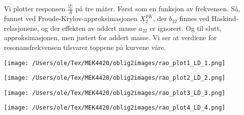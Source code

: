 Vi plotter responsen $\frac{|\xi|}{A}$ på tre måter. Først som en funksjon av frekvensen. Så, funnet ved Froude-Krylov-approksimasjonen $X_2^{FK}$, der $b_{22}$ finnes ved Haskind-relasjonene, og der effekten av addert masse $a_{22}$ er ignorert. Og til slutt, approksimasjonen, men justert for addert masse. Vi ser at verdiene for resonansfrekvensen tilsvarer toppene på kurvene våre.

\noindent
\begin{minipage}[t]{0.45\linewidth}
    \texttt{[image: /Users/ole/Tex/MEK4420/oblig2images/rao\_plot1\_LD\_1.png]}
\end{minipage}
\hspace{0.05\linewidth}
\begin{minipage}[t]{0.45\linewidth}
    \texttt{[image: /Users/ole/Tex/MEK4420/oblig2images/rao\_plot2\_LD\_2.png]}
\end{minipage}

\vspace{0.5cm} %

\noindent
\begin{minipage}[t]{0.45\linewidth}
    \texttt{[image: /Users/ole/Tex/MEK4420/oblig2images/rao\_plot3\_LD\_3.png]}
\end{minipage}
\hspace{0.05\linewidth}
\begin{minipage}[t]{0.45\linewidth}
    \texttt{[image: /Users/ole/Tex/MEK4420/oblig2images/rao\_plot4\_LD\_4.png]}
\end{minipage}